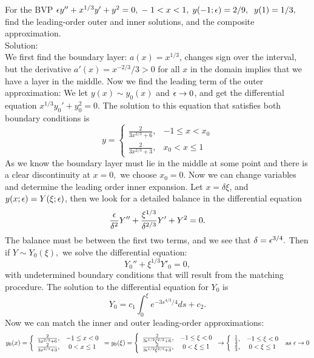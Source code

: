 \item  For the BVP $\epsilon y'' + x^{1/3} y' + y^2 = 0,\;-\; 1<x<1,\;y(-1;\epsilon)=2/9,\;\; y(1)=1/3,$  find the leading-order
outer and inner solutions, and the composite approximation.\\

Solution:\\

We first find the boundary layer: $a(x)=x^{1/3}$, changes sign over the interval, but the derivative $a'(x)=x^{-2/3}/3>0$ for all $x$ in the domain implies that we have a layer in the middle. Now we find the leading term of the outer approximation:
We let $y(x)\sim y_0(x)$ and $\epsilon\to 0$, and get the differential equation $x^{1/3}y_0'+y_0^2=0.$
The solution to this equation that satisfies both boundary conditions is
\[y=\left\{\begin{array}{cc}\frac{2}{3x^{2/3}+6}, &-1\leq x<x_0\\ \frac{2}{3x^{2/3}+3},&x_0<x\leq 1\end{array}\right.\]
As we know the boundary layer must lie in the middle at some point and there is a clear discontinuity at $x=0,$ we choose $x_0=0.$ Now we can change variables and determine the leading order inner expansion. Let $x=\delta \xi$, and $y(x;\epsilon)=Y(\xi;\epsilon)$, then we look for a detailed balance in the differential equation
\[\frac{\epsilon}{\delta^2}Y''+\frac{\xi^{1/3}}{\delta^{2/3}}Y'+Y^2=0.\]
The balance must be between the first two terms, and we see that $\delta= \epsilon^ {3/4}.$ Then if $Y\sim Y_0(\xi),$ we solve the differential equation:
\[Y_0''+\xi^{1/3}Y'_0=0,\]
with undetermined boundary conditions that will result from the matching procedure. The solution to the differential equation for $Y_0$ is
\[Y_0=c_1\int_0^\xi e^{-3s^{4/3}/4}ds+c_2.\]
Now we can match the inner and outer leading-order approximations:
\[y_0(x)=\left\{\begin{array}{cc}\frac{2}{3x^{2/3}+6}, &-1\leq x<0\\ \frac{2}{3x^{2/3}+3},&0<x\leq 1\end{array}\right.=y_0(\xi)=\left\{\begin{array}{cc}\frac{2}{3\epsilon^{1/2}\xi^{2/3}+6}, &-1\leq \xi<0\\ \frac{2}{3\epsilon^{1/2}\xi^{2/3}+3},&0<\xi\leq 1\end{array}\right. \to \left\{ \begin{array}{cc}\frac{1}{3}, &-1\leq \xi<0\\ \frac{2}{3}, &0<\xi\leq 1\end{array}\right. \text{ as }\epsilon\to 0\]
